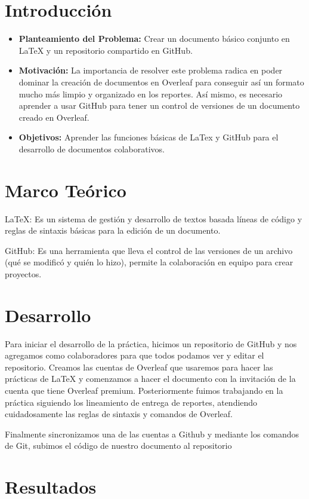 \documentclass[letterpaper,12pt]{article}
\begin{document}
\tableofcontents
\clearpage

\section{Introducción}

\begin{itemize}
\item \textbf{Planteamiento del Problema:} Crear un documento básico conjunto en LaTeX y un repositorio compartido en GitHub.
\item \textbf{Motivación:} La importancia de resolver este problema radica en poder dominar la creación de documentos en Overleaf para conseguir así un formato mucho más limpio y organizado en los reportes. Así mismo, es necesario aprender a usar GitHub para tener un control de versiones de un documento creado en Overleaf.
\item \textbf{Objetivos:} Aprender las funciones básicas de LaTex y GitHub para el desarrollo de documentos colaborativos.
\end{itemize}
\section{Marco Teórico}
LaTeX: Es un sistema de gestión y desarrollo de textos basada líneas de código y reglas de sintaxis básicas para la edición de un documento.

GitHub: Es una herramienta que lleva el control de las versiones de un archivo (qué se modificó y quién lo hizo), permite la colaboración en equipo para crear proyectos.

\section{Desarrollo}
Para iniciar el desarrollo de la práctica, hicimos un repositorio de GitHub y nos agregamos como colaboradores para que todos podamos ver y editar el repositorio. Creamos las cuentas de Overleaf que usaremos para hacer las prácticas de LaTeX y comenzamos a hacer el documento con la invitación de la cuenta que tiene Overleaf premium.
Posteriormente fuimos trabajando en la práctica siguiendo los lineamiento de entrega de reportes, atendiendo cuidadosamente las reglas de sintaxis y comandos de Overleaf.

Finalmente sincronizamos una de las cuentas a Github y mediante los comandos de Git, subimos el código de nuestro documento al repositorio

\section{Resultados}
\end{document}
